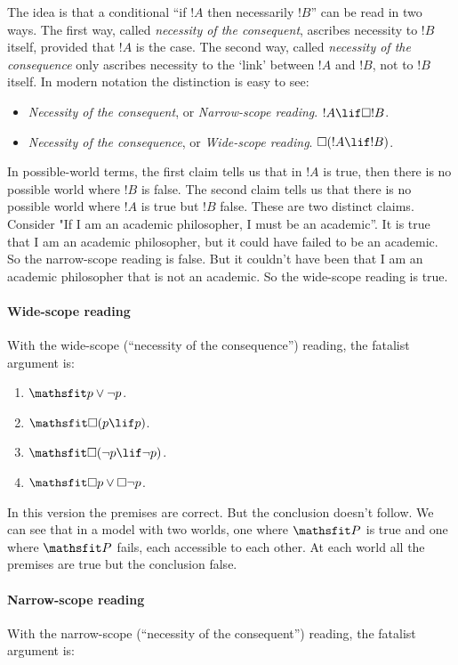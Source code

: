 \documentclass[../../../include/open-logic-section]{subfiles}
\begin{document}
The idea is that a conditional ``if $!A$ then necessarily $!B$'' can be read in two ways. The first way, called \emph{necessity of the consequent}, ascribes necessity to $!B$ itself, provided that $!A$ is the case. The second way, called \emph{necessity of the consequence} only ascribes necessity to the `link' between $!A$ and $!B$, not to $!B$ itself. In modern notation the distinction is easy to see:

\begin{itemize}
	\item \emph{Necessity of the consequent}, or \emph{Narrow-scope reading}. $!A \lif \Box !B$.
	\item \emph{Necessity of the consequence}, or \emph{Wide-scope reading}. $\Box (!A \lif !B)$.
\end{itemize}

In possible-world terms, the first claim tells us that in $!A$ is true, then there is no possible world where $!B$ is false. The second claim tells us that there is no possible world where $!A$ is true but $!B$ false. These are two distinct claims. Consider "If I am an academic philosopher, I must be an academic''. It is true that I am an academic philosopher, but it could have failed to be an academic. So the narrow-scope reading is false. But it couldn't have been that I am an academic philosopher that is not an academic. So the wide-scope reading is true. 

\paragraph*{Wide-scope reading} With the wide-scope (``necessity of the consequence'') reading, the fatalist argument is:

\begin{enumerate}
	\item $\Obj{p \lor \lnot p}$.
	\item $\Obj{\Box (p \lif p)}$.
	\item $\Obj{\Box (\lnot p \lif \lnot p)}$.
	\item $\Obj{\Box p \lor \Box \lnot p}$.
\end{enumerate}

In this version the premises are correct. But the conclusion doesn't follow. We can see that in a model with two worlds, one where $\Obj P$ is true and one where $\Obj P$ fails, each accessible to each other. At each world all the premises are true but the conclusion false. 

\paragraph*{Narrow-scope reading} With the narrow-scope (``necessity of the consequent'') reading, the fatalist argument is:
\end{document}
